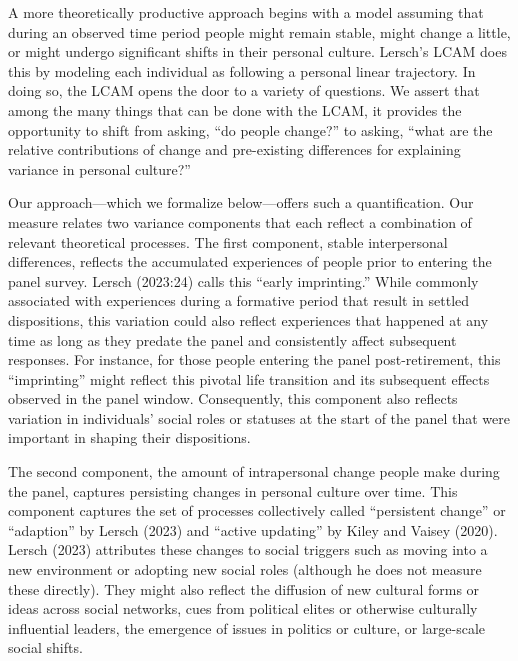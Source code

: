 \documentclass[
  11pt,
]{article}
\begin{document}
A more theoretically productive approach begins with a model assuming
that during an observed time period people might remain stable, might
change a little, or might undergo significant shifts in their personal
culture. Lersch's LCAM does this by modeling each individual as
following a personal linear trajectory. In doing so, the LCAM opens the
door to a variety of questions. We assert that among the many things
that can be done with the LCAM, it provides the opportunity to shift
from asking, ``do people change?'' to asking, ``what are the relative
contributions of change and pre-existing differences for explaining
variance in personal culture?''

Our approach---which we formalize below---offers such a quantification.
Our measure relates two variance components that each reflect a
combination of relevant theoretical processes. The first component,
stable interpersonal differences, reflects the accumulated experiences
of people prior to entering the panel survey. Lersch (2023:24) calls
this ``early imprinting.'' While commonly associated with experiences
during a formative period that result in settled dispositions, this
variation could also reflect experiences that happened at any time as
long as they predate the panel and consistently affect subsequent
responses. For instance, for those people entering the panel
post-retirement, this ``imprinting'' might reflect this pivotal life
transition and its subsequent effects observed in the panel window.
Consequently, this component also reflects variation in individuals'
social roles or statuses at the start of the panel that were important
in shaping their dispositions.

The second component, the amount of intrapersonal change people make
during the panel, captures persisting changes in personal culture over
time. This component captures the set of processes collectively called
``persistent change'' or ``adaption'' by Lersch (2023) and ``active
updating'' by Kiley and Vaisey (2020). Lersch (2023) attributes these
changes to social triggers such as moving into a new environment or
adopting new social roles (although he does not measure these directly).
They might also reflect the diffusion of new cultural forms or ideas
across social networks, cues from political elites or otherwise
culturally influential leaders, the emergence of issues in politics or
culture, or large-scale social shifts.
\end{document}
